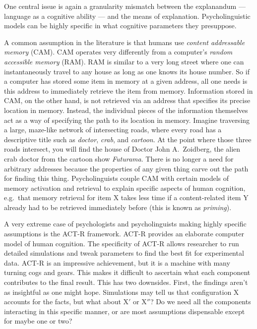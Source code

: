One central issue is again a granularity mismatch between the explanandum --- language as a cognitive ability --- and the means of explanation.
Psycholinguistic models can be highly specific in what cognitive parameters they presuppose.
%
\begin{examplebox}
    A common assumption in the literature is that humans use \emph{content addressable memory} (CAM).
    CAM operates very differently from a computer's \emph{random accessible memory} (RAM).
    RAM is similar to a very long street where one can instantaneously travel to any house as long as one knows its house number.
    So if a computer has stored some item in memory at a given address, all one needs is this address to immediately retrieve the item from memory.
    Information stored in CAM, on the other hand, is not retrieved via an address that specifies its precise location in memory.
    Instead, the individual pieces of the information themselves act as a way of specifying the path to its location in memory.
    Imagine traversing a large, maze-like network of intersecting roads, where every road has a descriptive title such as \emph{doctor}, \emph{crab}, and \emph{cartoon}. 
    At the point where those three roads intersect, you will find the house of Doctor John A.~Zoidberg, the alien crab doctor from the cartoon show \emph{Futurama}.
    There is no longer a need for arbitrary addresses because the properties of any given thing carve out the path for finding this thing.
    Psycholinguists couple CAM with certain models of memory activation and retrieval to explain specific aspects of human cognition, e.g.~that memory retrieval for item X takes less time if a content-related item Y already had to be retrieved immediately before (this is known as \emph{priming}).
\end{examplebox}
%
A very extreme case of psychologists and psycholinguists making highly specific assumptions is the ACT-R framework.
ACT-R provides an elaborate computer model of human cognition.
The specificity of ACT-R allows researcher to run detailed simulations and tweak parameters to find the best fit for experimental data.
ACT-R is an impressive achievement, but it is a machine with many turning cogs and gears.
This makes it difficult to ascertain what each component contributes to the final result.
This has two downsides.
First, the findings aren't as insightful as one might hope.
Simulations may tell us that configuration X accounts for the facts, but what about X$'$ or X$''$?
Do we need all the components interacting in this specific manner, or are most assumptions dispensable except for maybe one or two?

